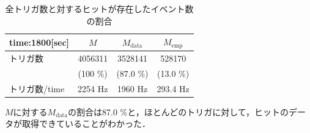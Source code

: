 \begin{table}[h]
  \centering
  \caption{全トリガ数と対するヒットが存在したイベント数の割合}
  \begin{tabular} {l|ccc} \hline
    time:1800[sec] & $M$ & $M_{\mathrm{data}}$ & $M_{\mathrm{emp}}$ \\ \hline
    トリガ数 & 4056311 & 3528141 & 528170 \\
     & (100 \%) & (87.0 \%) & (13.0 \%) \\ \hline
    トリガ数/time & 2254 $\mathrm{Hz}$ & 1960 $\mathrm{Hz}$ & 293.4 $\mathrm{Hz}$ \\ \hline
  \end{tabular}
  \label{tab:selfr}
\end{table}

$M$に対する$M_{\mathrm{data}}$の割合は87.0 \%と，ほとんどのトリガに対して，ヒットのデータが取得できていることがわかった．

